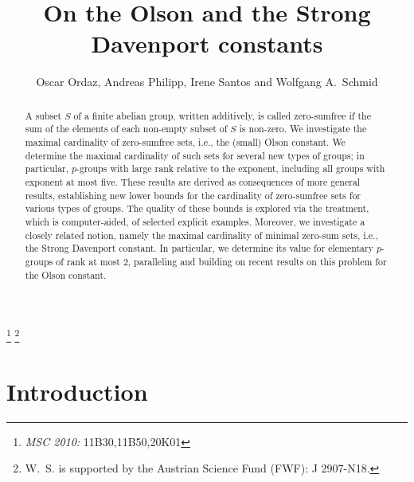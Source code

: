 \documentclass{amsart}
\theoremstyle{definition}
\numberwithin{equation}{section}
\begin{document}
\title{On the Olson and the Strong Davenport constants}

\author[O.~Ordaz, A.~Philipp, I.~Santos, and W.~A.~Schmid]{Oscar Ordaz, Andreas Philipp, Irene Santos and Wolfgang A.\ Schmid}
\address[O.~Ordaz and I.~Santos]{Departamento de Matem\'aticas y Centro ISYS, Facultad de Ciencias,
Universidad Central de Venezuela, Ap. 47567, Caracas 1041-A,
Venezuela.}
\address[A.~Philipp]{Institut f\"ur Mathematik und Wissenschaftliches Rechnen,
Karl-Fran\-zens-Universit\"at Graz,
Heinrichstra\ss e 36,
8010 Graz, Austria.}
\address[W.~A. Schmid]{CMLS, {\'E}cole polytechnique, 91128 Palaiseau cedex, France.}
\thanks{\emph{MSC 2010:} 11B30,11B50,20K01}
\thanks{W.~S. is supported by the Austrian Science Fund (FWF): J 2907-N18.}

\begin{abstract}
A subset $S$ of a finite abelian group, written additively, is called zero-sumfree if the sum of the elements of each non-empty subset of $S$ is non-zero.
We investigate the maximal cardinality of zero-sumfree sets, i.e., the (small) Olson constant.
We determine the maximal cardinality of such sets for several new types of groups; in particular, $p$-groups with large rank relative to the exponent, including all groups with exponent at most five. These results are derived as consequences of more general results, establishing new lower bounds for the cardinality of zero-sumfree sets for various types of groups.
The quality of these bounds is explored via the treatment, which is computer-aided, of selected explicit examples.
Moreover, we investigate  a closely related notion, namely the maximal cardinality of minimal zero-sum sets, i.e., the Strong Davenport constant.
In particular, we determine its value for elementary $p$-groups of rank at most $2$, paralleling and building on recent results on this problem for the Olson constant.
\end{abstract}

\maketitle

\section{Introduction}
\label{sec_intro}
\end{document}
